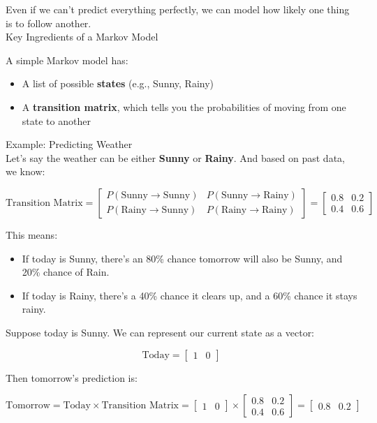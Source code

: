 \documentclass{book}
\begin{document}
Even if we can’t predict everything perfectly, we can model how likely one thing is to follow another.\\

Key Ingredients of a Markov Model

A simple Markov model has:
\begin{itemize}
  \item A list of possible \textbf{states} (e.g., Sunny, Rainy)
  \item A \textbf{transition matrix}, which tells you the probabilities of moving from one state to another
\end{itemize}

Example: Predicting Weather\\

Let’s say the weather can be either \textbf{Sunny} or \textbf{Rainy}. And based on past data, we know:

\[
\text{Transition Matrix} =
\begin{bmatrix}
P(\text{Sunny} \rightarrow \text{Sunny}) & P(\text{Sunny} \rightarrow \text{Rainy}) \\
P(\text{Rainy} \rightarrow \text{Sunny}) & P(\text{Rainy} \rightarrow \text{Rainy})
\end{bmatrix}
=
\begin{bmatrix}
0.8 & 0.2 \\
0.4 & 0.6
\end{bmatrix}
\]

This means:
\begin{itemize}
  \item If today is Sunny, there's an 80\% chance tomorrow will also be Sunny, and 20\% chance of Rain.
  \item If today is Rainy, there's a 40\% chance it clears up, and a 60\% chance it stays rainy.
\end{itemize}

Suppose today is Sunny. We can represent our current state as a vector:

\[
\text{Today} = \begin{bmatrix} 1 & 0 \end{bmatrix}
\]

Then tomorrow’s prediction is:

\[
\text{Tomorrow} = \text{Today} \times \text{Transition Matrix} = 
\begin{bmatrix} 1 & 0 \end{bmatrix} \times
\begin{bmatrix}
0.8 & 0.2 \\
0.4 & 0.6
\end{bmatrix}
=
\begin{bmatrix}
0.8 & 0.2
\end{bmatrix}
\]
\end{document}
